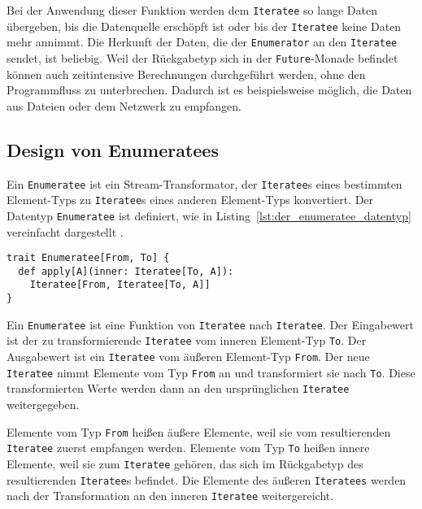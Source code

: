 Bei der Anwendung dieser Funktion werden dem \lstinline|Iteratee| so lange Daten übergeben, bis die Datenquelle erschöpft ist oder bis der \lstinline|Iteratee| keine Daten mehr annimmt.
Die Herkunft der Daten, die der \lstinline|Enumerator| an den \lstinline|Iteratee| sendet, ist beliebig.
Weil der Rückgabetyp sich in der \lstinline|Future|-Monade befindet können auch zeitintensive Berechnungen durchgeführt werden, ohne den Programmfluss zu unterbrechen.
Dadurch ist es beispielsweise möglich, die Daten aus Dateien oder dem Netzwerk zu empfangen.



\subsection{Design von Enumeratees} %
\label{sub:design_enumeratees}

Ein \lstinline|Enumeratee| ist ein Stream-Transformator, der \lstinline|Iteratee|s eines bestimmten Element-Typs zu \lstinline|Iteratee|s eines anderen Element-Typs konvertiert.
Der Datentyp \lstinline|Enumeratee| ist definiert, wie in Listing~\ref{lst:der_enumeratee_datentyp} vereinfacht dargestellt \cite[vgl.][]{play_enumeratee_source_code}.
\begin{lstlisting}[caption=Der Enumeratee-Datentyp, label=lst:der_enumeratee_datentyp]
trait Enumeratee[From, To] {
  def apply[A](inner: Iteratee[To, A]):
    Iteratee[From, Iteratee[To, A]]
}
\end{lstlisting}

Ein \lstinline|Enumeratee| ist eine Funktion von \lstinline|Iteratee| nach \lstinline|Iteratee|.
Der Eingabewert ist der zu transformierende \lstinline|Iteratee| vom inneren Element-Typ \lstinline|To|.
Der Ausgabewert ist ein \lstinline|Iteratee| vom äußeren Element-Typ \lstinline|From|.
Der neue \lstinline|Iteratee| nimmt Elemente vom Typ \lstinline|From| an und transformiert sie nach \lstinline|To|.
Diese transformierten Werte werden dann an den ursprünglichen \lstinline|Iteratee| weitergegeben.

Elemente vom Typ \lstinline|From| heißen äußere Elemente, weil sie vom resultierenden \lstinline|Iteratee| zuerst empfangen werden.
Elemente vom Typ \lstinline|To| heißen innere Elemente, weil sie zum \lstinline|Iteratee| gehören, das sich im Rückgabetyp des resultierenden \lstinline|Iteratee|s befindet.
Die Elemente des äußeren \lstinline|Iteratees| werden nach der Transformation an den inneren \lstinline|Iteratee| weitergereicht.

